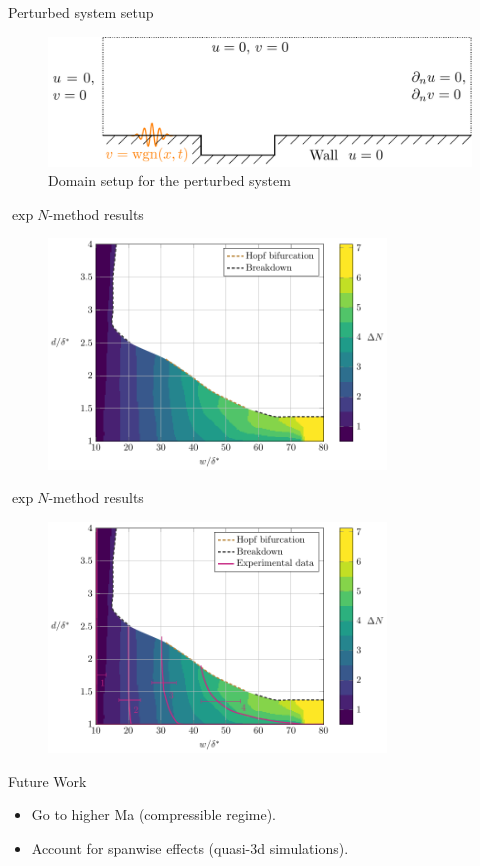 \documentclass[aspectratio=43, xcolor=table]{beamer}
\begin{document}
\begin{frame}{Perturbed system setup}

	\begin{figure}[ht]
		\centering
		\includegraphics[width=\textwidth]{../../Images/domainPert.pdf}
		\caption{Domain setup for the perturbed system}
	\end{figure}

\end{frame}
\begin{frame}{$\exp{N}$-method results}
	\begin{figure}
		\centering
		\includegraphics[width=0.8\textwidth]{Images/nfactor_countour_plain.pdf}
	\end{figure}
	\vspace{0.42cm}
\end{frame}
\begin{frame}{$\exp{N}$-method results}
	\begin{figure}
		\centering
		\includegraphics[width=0.8\textwidth]{Images/nfactor_countour.pdf}
	\end{figure}
\end{frame}
\begin{frame}{Future Work}
	\begin{itemize}
		\item Go to higher Ma (compressible regime).\pause
		\item Account for spanwise effects (quasi-3d simulations).
	\end{itemize}
\end{frame}
\end{document}
